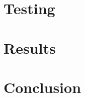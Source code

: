 \documentclass[
	paper=A4,
	titlepage=true,
	appendixprefix=true,
	headings=appendixwithoutprefixline,
	fontsize=11pt,
	parskip=half
]{scrreprt}
\begin{document}
	\chapter{Testing} {
	\label{ch:testing}
		
	}


	\chapter{Results} {
	\label{ch:results}
		
	}


	\chapter{Conclusion} {
	\label{ch:conclusion}
		
	}
	
	\renewcommand{\bibname}{References}
	\printbibliography[notcategory=exclude]

	
	
\end{document}
